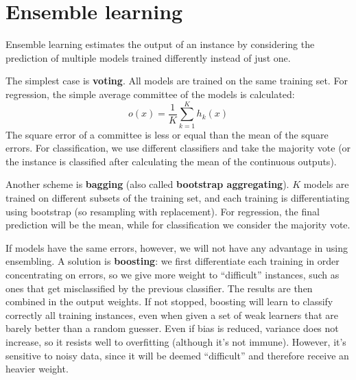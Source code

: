\section{Ensemble learning}

Ensemble learning estimates the output of an instance by considering the prediction of multiple models trained differently instead of just one.

The simplest case is \textbf{voting}. All models are trained on the same training set. For regression, the simple average committee of the models is calculated:
\begin{equation*}
    o(x) = \dfrac{1}{K} \sum_{k=1}^K h_k(x)
\end{equation*}
The square error of a committee is less or equal than the mean of the square errors. For classification, we use different classifiers and take the majority vote (or the instance is classified after calculating the mean of the continuous outputs).

Another scheme is \textbf{bagging} (also called \textbf{bootstrap aggregating}). $K$ models are trained on different subsets of the training set, and each training is differentiating using bootstrap (so resampling with replacement). For regression, the final prediction will be the mean, while for classification we consider the majority vote.

If models have the same errors, however, we will not have any advantage in using ensembling. A solution is \textbf{boosting}: we first differentiate each training in order concentrating on errors, so we give more weight to ``difficult'' instances, such as ones that get misclassified by the previous classifier. The results are then combined in the output weights. If not stopped, boosting will learn to classify correctly all training instances, even when given a set of weak learners that are barely better than a random guesser. Even if bias is reduced, variance does not increase, so it resists well to overfitting (although it's not immune). However, it's sensitive to noisy data, since it will be deemed ``difficult'' and therefore receive an heavier weight.


